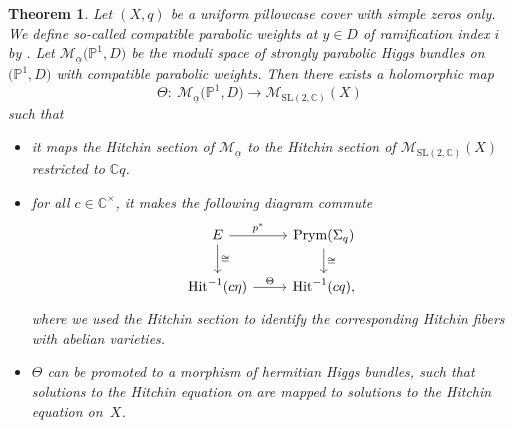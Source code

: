 \documentclass[pdftex]{sigma}
\numberwithin{equation}{section}
\newtheorem{theo}{Theorem}[section]
\theoremstyle{definition}
\renewcommand{\to}{\rightarrow}
\newcommand{\ualpha}{\underline{\alpha}}
\newcommand{\calM}{\mathcal{M}}
\newcommand{\CC}{\mathbb{C}}
\newcommand{\PP}{\mathbb{P}}
\newcommand{\Prym}{\mathrm{Prym}}
\newcommand{\Hit}{\mathrm{Hit}}
\newcommand{\SL}{\mathrm{SL}}
\begin{document}
\begin{theo}\label{theo:Theta}
 Let $(X,q)$ be a uniform pillowcase cover with simple zeros only. We define so-called compatible parabolic weights at $y \in D$ of ramification index $i$ by . Let $\calM_{\ualpha}\bigl(\PP^1,D\bigr)$ be the moduli space of strongly parabolic Higgs bundles on $\bigl(\PP^1,D\bigr)$ with compatible parabolic weights. Then there exists a holomorphic map
 \[ \Theta\colon \ \calM_{\ualpha}\bigl(\PP^1,D\bigr) \to \calM_{\SL(2,\CC)}(X)
 \] such that
 \begin{itemize}\itemsep=0pt
 \item[$(i)$] it maps the Hitchin section of $\calM_{\ualpha}$ to the Hitchin section of $\calM_{\SL(2,\CC)}(X)$ restricted to $\CC q$.
 \item[$(ii)$] for all $c \in \CC^\times$, it makes the following diagram commute
 \[ \begin{tikzcd} E \ar[r,"p^*"]\ar[d,"\cong"] & \Prym(\Sigma_q) \ar[d,"\cong"] \\
 \Hit^{-1}(c\eta) \ar[r,"\Theta"] & \Hit^{-1}(cq),
 \end{tikzcd} \]
 where we used the Hitchin section to identify the corresponding Hitchin fibers with abelian varieties.
 \item[$(iii)$] $\Theta$ can be promoted to a morphism of hermitian Higgs bundles, such that solutions to the Hitchin equation on \smash{$\bigl(\PP^1,D\bigr)$} are mapped to solutions to the Hitchin equation on~$X$.
 \end{itemize}
\end{theo}
\end{document}
